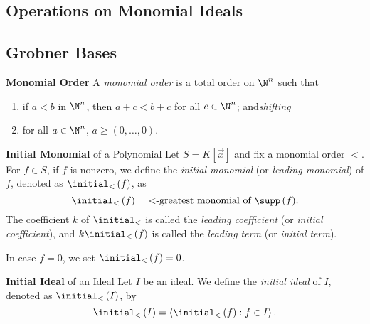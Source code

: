 \documentclass[11pt]{article}
\begin{document}
    \subsection{Operations on Monomial Ideals}
    
    \subsection{Grobner Bases}

    \begin{definition}{\textbf{Monomial Order}}
        A \emph{monomial order} is a total order on $\N^n$ such that
        \begin{enumerate}
            \item if $a<b$ in $\N^n$, then $a+c<b+c$ for all $c\in\N^n$; and\hfill\textit{shifting}
            \item for all $a\in\N^n$, $a\geq \left( 0,\ldots,0 \right)$.
        \end{enumerate}
    \end{definition}

    \begin{definition}{\textbf{Initial Monomial} of a Polynomial}
        Let $S = K\left[ \vec{x} \right]$ and fix a monomial order $<$. For $f\in S$, if $f$ is nonzero, we define the \emph{initial monomial} (or \emph{leading monomial}) of $f$, denoted as $\initial_<\left( f \right)$, as
        \begin{equation*}
            \initial_< \left( f \right) = \text{$<$-greatest monomial of $\supp\left( f \right)$}.
        \end{equation*}
        The coefficient $k$ of $\initial_<$ is called the \emph{leading coefficient} (or \emph{initial coefficient}), and $k\initial_<\left( f \right)$ is called the \emph{leading term} (or \emph{initial term}).

        In case $f=0$, we set $\initial_<\left( f \right)=0$.
    \end{definition}

    \begin{definition}{\textbf{Initial Ideal} of an Ideal}
        Let $I$ be an ideal. We define the \emph{initial ideal} of $I$, denoted as $\initial_<\left( I \right)$, by
        \begin{equation*}
            \initial_<\left( I \right) = \left< \initial_<\left( f \right):f\in I \right>. 
        \end{equation*}
    \end{definition}
\end{document}
